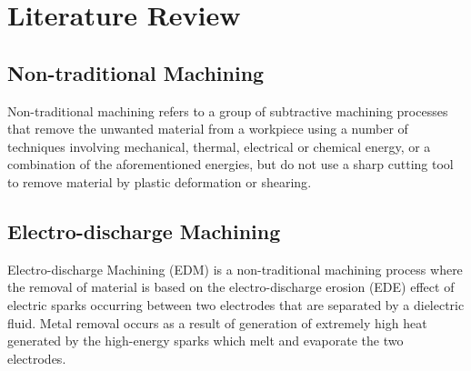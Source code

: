 \section{Literature Review}
\lhead{\leftmark}
\label{sec:review}
%
\subsection{Non-traditional Machining}
Non-traditional machining refers to a group of subtractive machining processes that remove the unwanted material from a workpiece using a number of techniques involving mechanical, thermal, electrical or chemical energy, or a combination of the aforementioned energies, but do not use a sharp cutting tool to remove material by plastic deformation or shearing\cite{classnotes}.

\subsection{Electro-discharge Machining}
Electro-discharge Machining (EDM) is a non-traditional machining process where the removal of material is based on the electro-discharge erosion (EDE) effect of electric sparks occurring between two electrodes that are separated by a dielectric fluid. Metal removal occurs as a result of generation of extremely high heat generated by the high-energy sparks which melt and evaporate the two electrodes.
